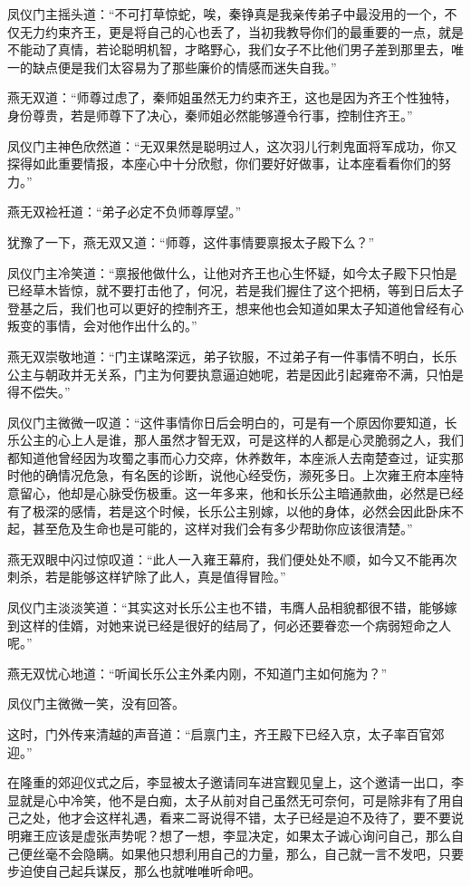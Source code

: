 凤仪门主摇头道：“不可打草惊蛇，唉，秦铮真是我亲传弟子中最没用的一个，不仅无力约束齐王，更是将自己的心也丢了，当初我教导你们的最重要的一点，就是不能动了真情，若论聪明机智，才略野心，我们女子不比他们男子差到那里去，唯一的缺点便是我们太容易为了那些廉价的情感而迷失自我。”

燕无双道：“师尊过虑了，秦师姐虽然无力约束齐王，这也是因为齐王个性独特，身份尊贵，若是师尊下了决心，秦师姐必然能够遵令行事，控制住齐王。”

凤仪门主神色欣然道：“无双果然是聪明过人，这次羽儿行刺鬼面将军成功，你又探得如此重要情报，本座心中十分欣慰，你们要好好做事，让本座看看你们的努力。”

燕无双裣衽道：“弟子必定不负师尊厚望。”

犹豫了一下，燕无双又道：“师尊，这件事情要禀报太子殿下么？”

凤仪门主冷笑道：“禀报他做什么，让他对齐王也心生怀疑，如今太子殿下只怕是已经草木皆惊，就不要打击他了，何况，若是我们握住了这个把柄，等到日后太子登基之后，我们也可以更好的控制齐王，想来他也会知道如果太子知道他曾经有心叛变的事情，会对他作出什么的。”

燕无双崇敬地道：“门主谋略深远，弟子钦服，不过弟子有一件事情不明白，长乐公主与朝政并无关系，门主为何要执意逼迫她呢，若是因此引起雍帝不满，只怕是得不偿失。”

凤仪门主微微一叹道：“这件事情你日后会明白的，可是有一个原因你要知道，长乐公主的心上人是谁，那人虽然才智无双，可是这样的人都是心灵脆弱之人，我们都知道他曾经因为攻蜀之事而心力交瘁，休养数年，本座派人去南楚查过，证实那时他的确情况危急，有名医的诊断，说他心经受伤，濒死多日。上次雍王府本座特意留心，他却是心脉受伤极重。这一年多来，他和长乐公主暗通款曲，必然是已经有了极深的感情，若是这个时候，长乐公主别嫁，以他的身体，必然会因此卧床不起，甚至危及生命也是可能的，这样对我们会有多少帮助你应该很清楚。”

燕无双眼中闪过惊叹道：“此人一入雍王幕府，我们便处处不顺，如今又不能再次刺杀，若是能够这样铲除了此人，真是值得冒险。”

凤仪门主淡淡笑道：“其实这对长乐公主也不错，韦膺人品相貌都很不错，能够嫁到这样的佳婿，对她来说已经是很好的结局了，何必还要眷恋一个病弱短命之人呢。”

燕无双忧心地道：“听闻长乐公主外柔内刚，不知道门主如何施为？”

凤仪门主微微一笑，没有回答。

这时，门外传来清越的声音道：“启禀门主，齐王殿下已经入京，太子率百官郊迎。”

在隆重的郊迎仪式之后，李显被太子邀请同车进宫觐见皇上，这个邀请一出口，李显就是心中冷笑，他不是白痴，太子从前对自己虽然无可奈何，可是除非有了用自己之处，他才会这样礼遇，看来二哥说得不错，太子已经是迫不及待了，要不要说明雍王应该是虚张声势呢？想了一想，李显决定，如果太子诚心询问自己，那么自己便丝毫不会隐瞒。如果他只想利用自己的力量，那么，自己就一言不发吧，只要步迫使自己起兵谋反，那么也就唯唯听命吧。

